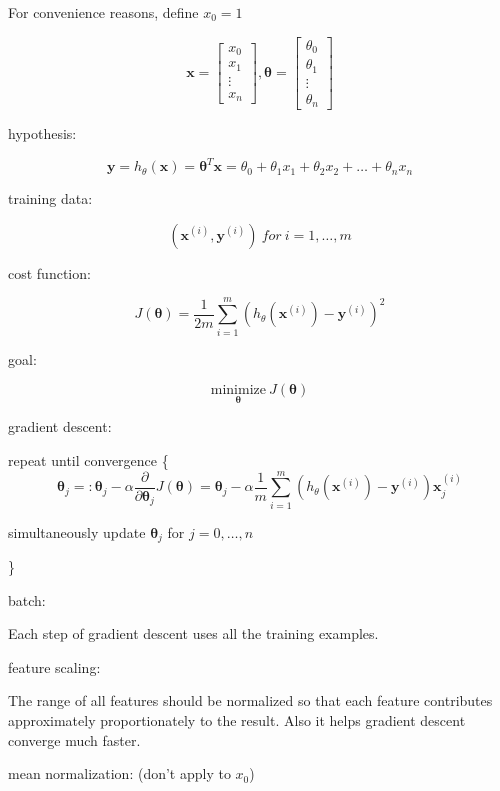 \documentclass{article}
\begin{document}
\noindent For convenience reasons, define \(x_0 = 1\)

\[
\textbf{x} = 
\begin{bmatrix}
x_0\\
x_1\\
\vdots\\
x_n
\end{bmatrix}
,
\boldsymbol{\theta} = 
\begin{bmatrix}
\theta_0\\
\theta_1\\
\vdots\\
\theta_n
\end{bmatrix}
\]

\noindent hypothesis:

\[\textbf{y} = h_{\theta}(\textbf{x}) = \boldsymbol{\theta}^T \textbf{x} = \theta_0 + \theta_1 x_1 + \theta_2 x_2 + \dots + \theta_n x_n\]

\noindent training data:

\[(\textbf{x}^{(i)}, \textbf{y}^{(i)})\:for\:i = 1, \dots, m\]

\noindent cost function:

\[J(\boldsymbol{\theta}) = \frac{1}{2m} \sum_{i = 1}^m (h_{\theta}(\textbf{x}^{(i)}) - \textbf{y}^{(i)})^2\]

\noindent goal:

\[\underset{\boldsymbol{\theta}}{\text{minimize}} \: J(\boldsymbol{\theta})\]

\noindent gradient descent:

\noindent repeat until convergence \{
\[\boldsymbol{\theta}_j =: \boldsymbol{\theta}_j - \alpha \frac{\partial}{\partial \boldsymbol{\theta}_j} J(\boldsymbol{\theta}) = \boldsymbol{\theta}_j - \alpha \frac{1}{m} \sum_{i = 1}^m (h_{\theta}(\textbf{x}^{(i)}) - \textbf{y}^{(i)}) \textbf{x}^{(i)}_j\]
\centerline{simultaneously update \(\boldsymbol{\theta}_j\) for \(j = 0, \dots, n\)}
\}

\bigskip

\noindent batch:

\noindent Each step of gradient descent uses all the training examples.

\bigskip

\noindent feature scaling:

\noindent The range of all features should be normalized so that each feature contributes approximately proportionately to the result. Also it helps gradient descent converge much faster.

\noindent mean normalization: (don't apply to \(x_0\))
\end{document}
